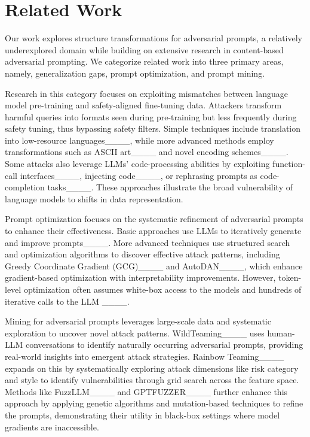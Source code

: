\section{Related Work}
\label{sec:related_work}
Our work explores structure transformations for adversarial prompts, a relatively underexplored domain while building on extensive research in content-based adversarial prompting. We categorize related work into three primary areas, namely, generalization gaps, prompt optimization, and prompt mining.

 Research in this category focuses on exploiting mismatches between language model pre-training and safety-aligned fine-tuning data. Attackers transform harmful queries into formats seen during pre-training but less frequently during safety tuning, thus bypassing safety filters. Simple techniques include translation into low-resource languages____, while more advanced methods employ transformations such as ASCII art____ and novel encoding schemes____. Some attacks also leverage LLMs' code-processing abilities by exploiting function-call interfaces____, injecting code____, or rephrasing prompts as code-completion tasks____. These approaches illustrate the broad vulnerability of language models to shifts in data representation.

 Prompt optimization focuses on the systematic refinement of adversarial prompts to enhance their effectiveness. Basic approaches use LLMs to iteratively generate and improve prompts____.
More advanced techniques use structured search and optimization algorithms to discover effective attack patterns, including Greedy Coordinate Gradient (GCG)____ and AutoDAN____, which enhance gradient-based optimization with interpretability improvements.
However, token-level optimization often assumes white-box access to the models and hundreds of iterative calls to the LLM ____.

 Mining for adversarial prompts leverages large-scale data and systematic exploration to uncover novel attack patterns. WildTeaming____ uses human-LLM conversations to identify naturally occurring adversarial prompts, providing real-world insights into emergent attack strategies. Rainbow Teaming____ expands on this by systematically exploring attack dimensions like risk category and style to identify vulnerabilities through grid search across the feature space. Methods like FuzzLLM____ and GPTFUZZER____ further enhance this approach by applying genetic algorithms and mutation-based techniques to refine the prompts, demonstrating their utility in black-box settings where model gradients are inaccessible.

